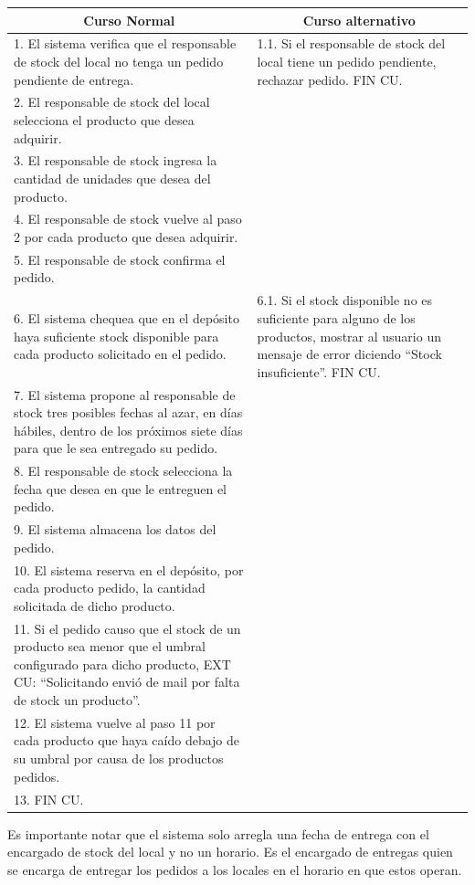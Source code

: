 \begin{center}
\begin{tabular}{|p{}|p{}|}
    \hline
    \multicolumn{1}{|c|}{Curso Normal} &
    \multicolumn{1}{|c|}{Curso alternativo} \\
    \hline
    1. El sistema verifica que el responsable de stock del local no tenga un pedido pendiente de entrega. &
    1.1. Si el responsable de stock del local tiene un pedido pendiente, rechazar pedido. FIN CU. \\
    2. El responsable de stock del local selecciona el producto que desea
    adquirir. & \\
    3. El responsable de stock ingresa la cantidad de unidades que desea del
    producto. & \\
    4. El responsable de stock vuelve al paso 2 por cada producto que desea
    adquirir. & \\
    5. El responsable de stock confirma el pedido. & \\
    6. El sistema chequea que en el depósito haya suficiente stock disponible para cada producto solicitado en el pedido. &
    6.1. Si el stock disponible no es suficiente para alguno de los productos, mostrar al usuario un mensaje de error diciendo ``Stock insuficiente''. FIN CU. \\
    7. El sistema propone al responsable de stock tres posibles fechas al azar, en días hábiles, dentro de los próximos siete días para que le sea entregado su pedido. & \\
    8. El responsable de stock selecciona la fecha que desea en que le entreguen el pedido. & \\
    9. El sistema almacena los datos del pedido. & \\
	10. El sistema reserva en el depósito, por cada producto pedido, la cantidad solicitada de dicho producto. & \\
	11. Si el pedido causo que el stock de un producto sea menor que el umbral configurado para dicho producto, EXT CU: ``Solicitando envió de mail por falta de stock un producto''. & \\
	12. El sistema vuelve al paso 11 por cada producto que haya caído debajo de su umbral por causa de los productos pedidos. & \\
    13. FIN CU. & \\
    \hline
\end{tabular}
\end{center}

Es importante notar que el sistema solo arregla una fecha de entrega con el encargado de stock del local y no un horario. Es el encargado de entregas quien se encarga de entregar los pedidos a los locales en el horario en que estos operan.

